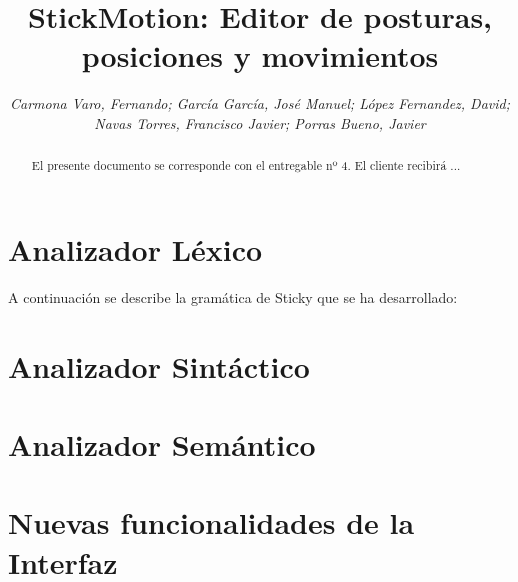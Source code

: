 \documentclass[a4paper,12pt]{article}
\title{\textbf{StickMotion:} Editor de posturas, posiciones y movimientos}
\author{\small\textit{Carmona Varo, Fernando; García García, José Manuel; López Fernandez, David;}\\
	\small\textit{Navas Torres, Francisco Javier; Porras Bueno, Javier}}
\begin{document}
  \maketitle %

  \begin{abstract}
    El presente documento se corresponde con el entregable nº 4. El cliente recibirá ... \\
  \end{abstract}

  \section{Analizador Léxico}
  A continuación se describe la gramática de Sticky que se ha desarrollado:
  
  
  \section{Analizador Sintáctico}


  \section{Analizador Semántico}
  

  \section{Nuevas funcionalidades de la Interfaz}
\end{document}
